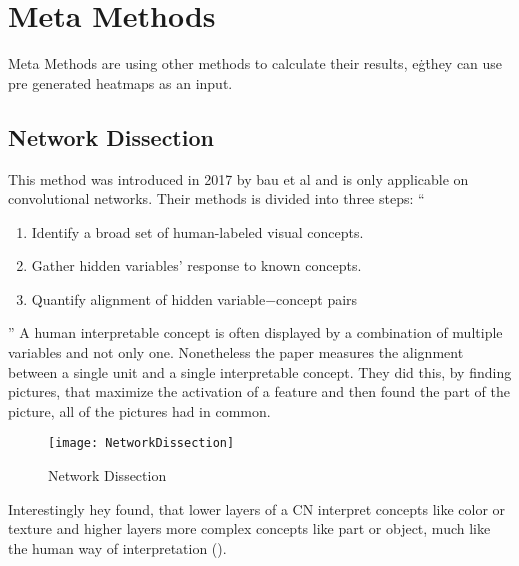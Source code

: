 \section{Meta Methods}
Meta Methods are using other methods to calculate their results, e\.g\. they can use pre generated heatmaps as an input.

\subsection{Network Dissection}
This method was introduced in 2017 by bau et al and is only applicable on convolutional networks. Their methods is divided into three steps: 
“
\begin{enumerate}
    \item  Identify a broad set of human-labeled visual concepts. 
    \item Gather hidden variables’ response to known concepts.
    \item Quantify alignment of hidden variable−concept pairs
\end{enumerate}
”
A human interpretable concept is often displayed by a combination of multiple variables and not only one. Nonetheless the paper measures the alignment between a single unit and a single interpretable concept. 
They did this, by finding pictures, that maximize the activation of a feature and then found the part of the picture, all of the pictures had in common.
\begin{figure*}
    \center
    \texttt{[image: NetworkDissection]}
    \caption{Network Dissection}
\end{figure*}

Interestingly hey found, that lower layers of a CN interpret concepts like color or texture and higher layers more complex concepts like part or object, much like the human way of interpretation ().

